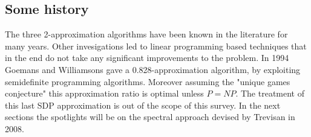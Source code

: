 \subsection{Some history}
The three 2-approximation algorithms have been known in the literature for many years.
Other invesigations led to linear programming based techniques that in the end do not take any significant improvements to the problem.
In 1994 Goemans and Williamsons gave a 0.828-approximation algorithm, by exploiting semidefinite programming algorithms. 
Moreover assuming the "unique games conjecture" this approximation ratio is optimal unless $P=NP$.
The treatment of this last SDP approximation is out of the scope of this survey. 
In the next sections the spotlights will be on the spectral approach devised by Trevisan in 2008.
